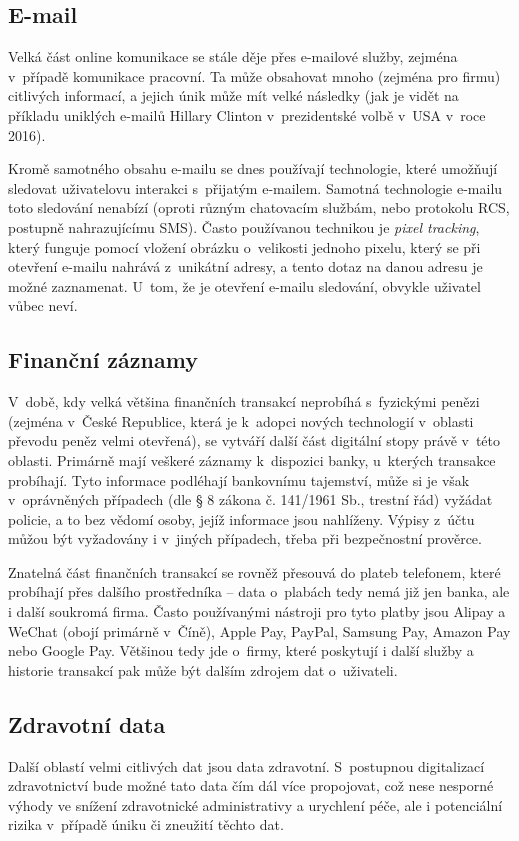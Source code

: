 \subsection{E-mail}
Velká část online komunikace se stále děje přes e-mailové služby, zejména v~případě komunikace pracovní. Ta může obsahovat mnoho (zejména pro firmu) citlivých informací, a jejich únik může mít velké následky (jak je vidět na příkladu uniklých e-mailů Hillary Clinton v~prezidentské volbě v~USA v~roce 2016).

Kromě samotného obsahu e-mailu se dnes používají technologie, které umožňují sledovat uživatelovu interakci s~přijatým e-mailem. Samotná technologie e-mailu toto sledování nenabízí (oproti různým chatovacím službám, nebo protokolu RCS, postupně nahrazujícímu SMS). Často používanou technikou je \textit{pixel tracking}, který funguje pomocí vložení  obrázku o~velikosti jednoho pixelu, který se při otevření e-mailu nahrává z~unikátní adresy, a tento dotaz na danou adresu je možné zaznamenat. U~tom, že je otevření e-mailu sledování, obvykle uživatel vůbec neví.

\subsection{Finanční záznamy}
V~době, kdy velká většina finančních transakcí neprobíhá s~fyzickými penězi (zejména v~České Republice, která je k~adopci nových technologií v~oblasti převodu peněz velmi otevřená), se vytváří další část digitální stopy právě v~této oblasti.
Primárně mají veškeré záznamy k~dispozici banky, u~kterých transakce probíhají. Tyto informace podléhají bankovnímu tajemství, může si je však v~oprávněných případech (dle § 8 zákona č. 141/1961 Sb., trestní řád) vyžádat policie, a to bez vědomí osoby, jejíž informace jsou nahlíženy. Výpisy z~účtu můžou být vyžadovány i v~jiných případech, třeba při bezpečnostní prověrce.

Znatelná část finančních transakcí se rovněž přesouvá do plateb telefonem, které probíhají přes dalšího prostředníka -- data o~plabách tedy nemá již jen banka, ale i další soukromá firma. Často používanými nástroji pro tyto platby jsou Alipay a WeChat (obojí primárně v~Číně), Apple Pay, PayPal, Samsung Pay, Amazon Pay nebo Google Pay. Většinou tedy jde o~firmy, které poskytují i další služby a historie transakcí pak může být dalším zdrojem dat o~uživateli.

\subsection{Zdravotní data}
Další oblastí velmi citlivých dat jsou data zdravotní. S~postupnou digitalizací zdravotnictví bude možné tato data čím dál více propojovat, což nese nesporné výhody ve snížení zdravotnické administrativy a urychlení péče, ale i potenciální rizika v~případě úniku či zneužití těchto dat.

